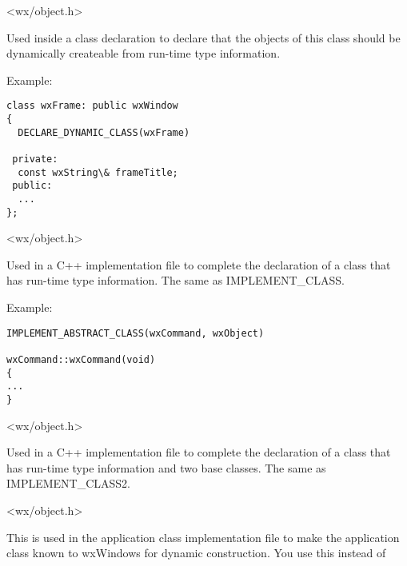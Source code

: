 
<wx/object.h>



Used inside a class declaration to declare that the objects of this class should be dynamically
createable from run-time type information.

Example:

\begin{verbatim}
class wxFrame: public wxWindow
{
  DECLARE_DYNAMIC_CLASS(wxFrame)

 private:
  const wxString\& frameTitle;
 public:
  ...
};
\end{verbatim}


<wx/object.h>



Used in a C++ implementation file to complete the declaration of
a class that has run-time type information. The same as IMPLEMENT\_CLASS.

Example:

\begin{verbatim}
IMPLEMENT_ABSTRACT_CLASS(wxCommand, wxObject)

wxCommand::wxCommand(void)
{
...
}
\end{verbatim}


<wx/object.h>



Used in a C++ implementation file to complete the declaration of
a class that has run-time type information and two base classes. The same as IMPLEMENT\_CLASS2.


<wx/object.h>

\label{implementapp}


This is used in the application class implementation file to make the application class known to
wxWindows for dynamic construction. You use this instead of

